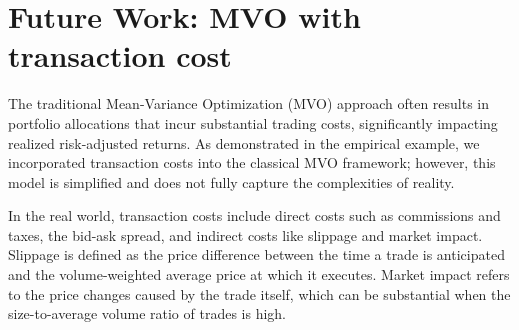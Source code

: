 \documentclass[13pt]{article}
\theoremstyle{definition}
\theoremstyle{remark}
\begin{document}











\newpage
\section{Future Work: MVO with transaction cost}
The traditional Mean-Variance Optimization (MVO) approach often results in portfolio allocations that incur substantial trading costs, significantly impacting realized risk-adjusted returns. As demonstrated in the empirical example, we incorporated transaction costs into the classical MVO framework; however, this model is simplified and does not fully capture the complexities of reality.

In the real world, transaction costs include direct costs such as commissions and taxes, the bid-ask spread, and indirect costs like slippage and market impact. Slippage is defined as the price difference between the time a trade is anticipated and the volume-weighted average price at which it executes. Market impact refers to the price changes caused by the trade itself, which can be substantial when the size-to-average volume ratio of trades is high.
\end{document}
